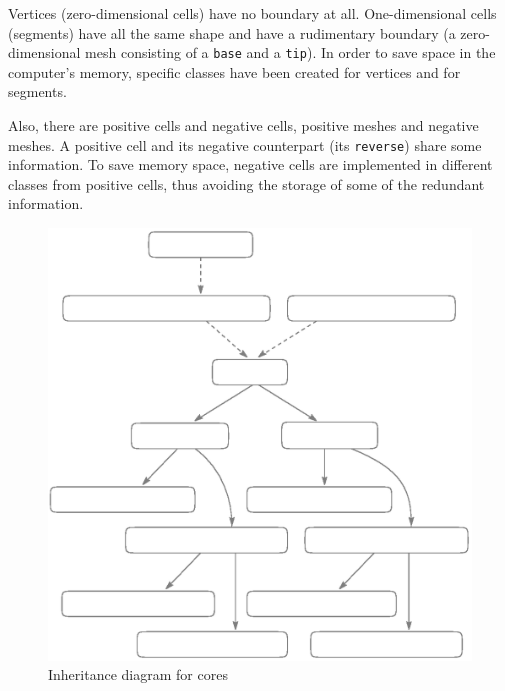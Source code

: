 Vertices (zero-dimensional cells) have no boundary at all.
One-dimensional cells (segments) have all the same shape and have a rudimentary boundary
(a zero-dimensional mesh consisting of a {\small\tt base} and a {\small\tt tip}).
In order to save space in the computer's memory, specific classes have been created for
vertices and for segments.

Also, there are positive cells and negative cells, positive meshes and negative meshes.
A positive cell and its negative counterpart (its {\small\tt reverse}) share some information.
To save memory space, negative cells are implemented in different classes from
positive cells, thus avoiding the storage of some of the redundant information.

\begin{figure}[ht] \centering
 \includegraphics{diagr-cell-rev}
 \caption{Inheritance diagram for {\small\tt{}} cores}
 \label{\numb section 11.\numb fig 1}
\end{figure}

